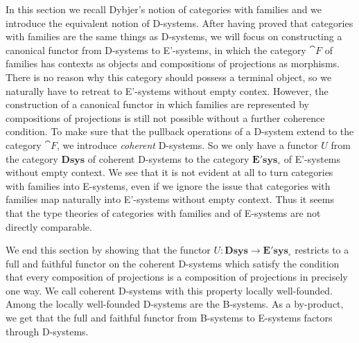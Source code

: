 In this section we recall Dybjer's notion of categories with families and we
introduce the equivalent notion of D-systems. After having proved that categories with families
are the same things as D-systems, we will focus on constructing a canonical functor from
D-systems to E'-systems, in which the category $\cat{F}$ of families has contexts
as objects and compositions of projections as morphisms. There is no reason why
this category should possess a terminal object, so we naturally have to retreat
to E'-systems without empty contex. However, the construction of a
canonical functor in which families are represented by compositions of projections
is still not possible without a further coherence condition. To make sure that
the pullback operations of a D-system extend to the category
$\cat{F}$, we introduce \emph{coherent} D-systems. So we only have a functor $U$
from the category $\mathbf{Dsys}$ of coherent D-systems to the category
$\mathbf{E'sys_{\circ}}$ of E'-systems without empty context.
We see that it is not evident at all to turn categories with families into
E-systems, even if we ignore the issue that categories with families map
naturally into E'-systems without empty context.
Thus it seems that the type theories of categories with families and of E-systems
are not directly comparable.

We end this section by showing that the functor 
$U:\mathbf{Dsys}\to\mathbf{E'sys_{\circ}}$ restricts to a full and faithful 
functor on the coherent D-systems which satisfy the condition that every 
composition of projections is a composition of projections in precisely one way.
We call coherent D-systems with this property
locally well-founded. Among the locally well-founded D-systems are the B-systems.
As a by-product, we get that the full and faithful functor from B-systems to
E-systems factors through D-systems. 

